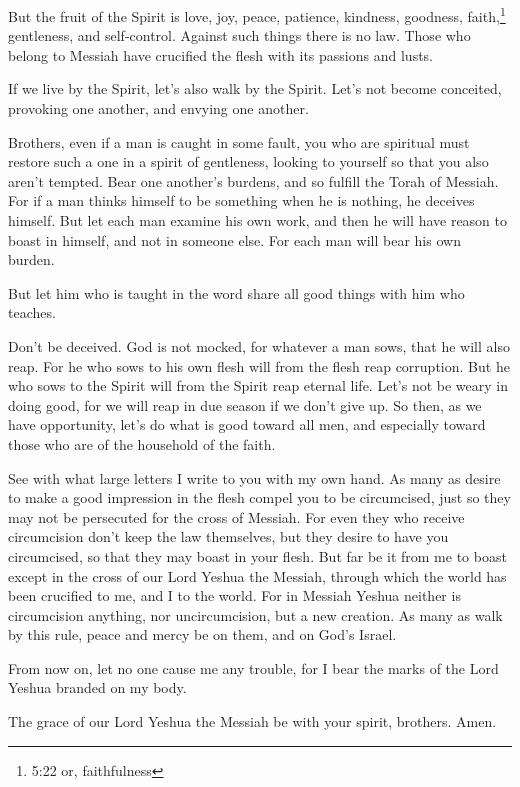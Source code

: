 \myverse{}But the fruit of the Spirit is love, joy, peace, patience, kindness,
goodness, faith,\footnote{5:22 or, faithfulness}
\myverse{}gentleness, and self-control. Against such things there is no law.
\myverse{}Those who belong to Messiah have crucified the flesh with its passions and
lusts.

\myverse{}If we live by the Spirit, let’s also walk by the Spirit.
\myverse{}Let’s not become conceited, provoking one another, and envying one another.


\mychapter{} \myverse*{}Brothers, even if a man is caught in some fault, you who are spiritual
must restore such a one in a spirit of gentleness, looking to yourself so that you also aren’t tempted.
\myverse{}Bear one another’s burdens, and so fulfill the Torah of Messiah.
\myverse{}For if a man thinks himself to be something when he is nothing, he deceives
himself.
\myverse{}But let each man examine his own work, and then he will have reason to boast
in himself, and not in someone else.
\myverse{}For each man will bear his own burden.

\myverse{}But let him who is taught in the word share all good things with
him who teaches.

\myverse{}Don’t be deceived. God is not mocked, for whatever a man sows,
that he will also reap.
\myverse{}For he who sows to his own flesh will from the flesh reap corruption. But he
who sows to the Spirit will from the Spirit reap eternal life.
\myverse{}Let’s not be weary in doing good, for we will reap in due season if we don’t
give up.
\myverse{}So then, as we have opportunity, let’s do what is good toward all men, and
especially toward those who are of the household of the faith.

\myverse{}See with what large letters I write to you with my own hand.
\myverse{}As many as desire to make a good impression in the flesh compel you to be
circumcised, just so they may not be persecuted for the cross of Messiah.
\myverse{}For even they who receive circumcision don’t keep the law themselves, but
they desire to have you circumcised, so that they may boast in your flesh.
\myverse{}But far be it from me to boast except in the cross of our Lord Yeshua the Messiah,
through which the world has been crucified to me, and I to the world.
\myverse{}For in Messiah Yeshua neither is circumcision anything, nor uncircumcision,
but a new creation.
\myverse{}As many as walk by this rule, peace and mercy be on them, and on God’s Israel.

\myverse{}From now on, let no one cause me any trouble, for I bear the
marks of the Lord Yeshua branded on my body.

\myverse{}The grace of our Lord Yeshua the Messiah be with your spirit,
brothers. Amen.



